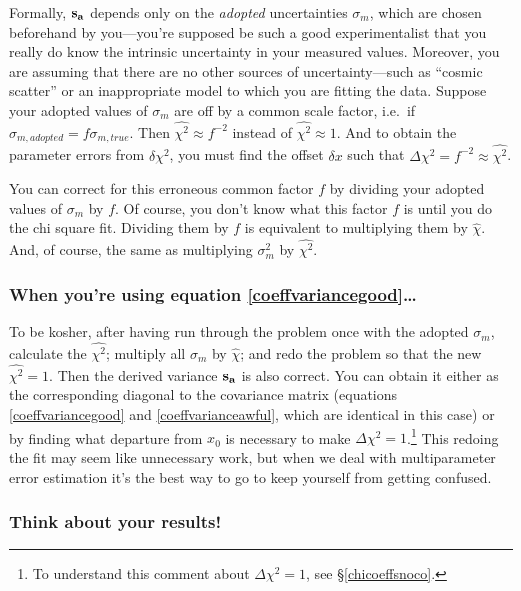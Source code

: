 \documentclass[psfig,preprint]{aastex}
\begin{document}
        Formally, ${\bf s_a}$ depends only on the {\it adopted}
uncertainties $\sigma_{m}$, which are chosen beforehand by
you---you're supposed be such a good experimentalist that you really do
know the intrinsic uncertainty in your measured values.  Moreover, you
are assuming that there are no other sources of uncertainty---such as
``cosmic scatter'' or an inappropriate model to which you are fitting
the data.  Suppose your adopted values of $\sigma_{m}$ are off by a
common scale factor, i.e.\ if $\sigma_{m,adopted} =
f\sigma_{m,true}$.  Then $\widehat{\chi^2} \approx f^{-2}$ instead of
$\widehat{\chi^2} \approx 1$.  And to obtain the parameter errors from
$\delta \chi^2$, you must find the offset $\delta x$ such that $\Delta
\chi^2 = f^{-2} \approx \widehat{\chi^2}$. 

	You can correct for this erroneous common factor $f$ by dividing
your adopted values of $\sigma_{m}$ by $f$.  Of course, you don't
know what this factor $f$ is until you do the chi square fit.  Dividing
them by $f$ is equivalent to multiplying them by $\widehat{\chi}$.  And,
of course, the same as multiplying $\sigma_{m}^2$ by
$\widehat{\chi^2}$. 

\subsubsection{When you're using equation \ref{coeffvariancegood}\dots}
\label{diatrabetwo}

	To be kosher, after having run through the problem once with the
adopted $\sigma_{m}$, calculate the $\widehat{\chi^2}$; multiply all
$\sigma_{m}$ by $\widehat{\chi}$; and redo the problem so that the new
$\widehat{\chi^2} = 1$.  Then the derived variance ${\bf s_a}$ is also
correct.  You can obtain it either as the corresponding diagonal to the
covariance matrix (equations \ref{coeffvariancegood} and
\ref{coeffvarianceawful}, which are identical in this case) or by
finding what departure from $x_0$ is necessary to make $\Delta \chi^2 =
1$.\footnote{To understand this comment about $\Delta \chi^2 = 1$, see
\S \ref {chicoeffsnoco}.} This redoing the fit may seem like unnecessary
work, but when we deal with multiparameter error estimation it's the
best way to go to keep yourself from getting confused. 

\subsubsection{Think about your results!}
\end{document}

